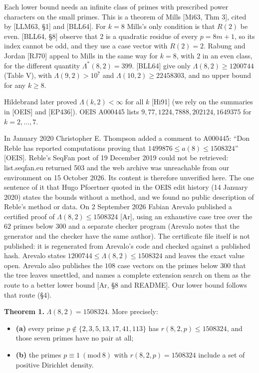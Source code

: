 \documentclass[
]{amsart}
\providecommand{\tightlist}{%
  \setlength{\itemsep}{0pt}\setlength{\parskip}{0pt}}
\begin{document}
Each lower bound needs an infinite class of primes with prescribed power
characters on the small primes. This is a theorem of Mills {[}Mi63, Thm
3{]}, cited by {[}LLM63, §1{]} and {[}BLL64{]}. For \(k=8\) Mills's only
condition is that \(R(2)\) be even. {[}BLL64, §8{]} observe that \(2\)
is a quadratic residue of every \(p=8m+1\), so its index cannot be odd,
and they use a case vector with \(R(2)=2\). Rabung and Jordan {[}RJ70{]}
appeal to Mills in the same way for \(k=8\), with \(2\) in an even
class, for the different quantity \(\Lambda^*(8,2)=399\). {[}BLL64{]}
give only \(\Lambda(8,2)\ge1200744\) (Table V), with
\(\Lambda(9,2)>10^7\) and \(\Lambda(10,2)\ge22458303\), and no upper
bound for any \(k\ge8\).

Hildebrand later proved \(\Lambda(k,2)<\infty\) for all \(k\) {[}Hi91{]}
(we rely on the summaries in {[}OEIS{]} and {[}EP436{]}). OEIS A000445
lists \(9,77,1224,7888,202124,1649375\) for \(k=2,\dots,7\).

In January 2020 Christopher E. Thompson added a comment to A000445:
``Don Reble has reported computations proving that
\(1499876\le a(8)\le1508324\)'' {[}OEIS{]}. Reble's SeqFan post of 19
December 2019 could not be retrieved: list.seqfan.eu returned 503 and
the web archive was unreachable from our environment on 15 October 2026.
Its content is therefore unverified here. The one sentence of it that
Hugo Pfoertner quoted in the OEIS edit history (14 January 2020) states
the bounds without a method, and we found no public description of
Reble's method or data. On 2 September 2026 Fabian Arevalo published a
certified proof of \(\Lambda(8,2)\le1508324\) {[}Ar{]}, using an
exhaustive case tree over the \(62\) primes below \(300\) and a separate
checker program (Arevalo notes that the generator and the checker have
the same author). The certificate file itself is not published: it is
regenerated from Arevalo's code and checked against a published hash.
Arevalo states \(1200744\le\Lambda(8,2)\le1508324\) and leaves the exact
value open. Arevalo also publishes the \(108\) case vectors on the
primes below \(300\) that the tree leaves unsettled, and names a
complete extension search on them as the route to a better lower bound
{[}Ar, §8 and README{]}. Our lower bound follows that route (§4).

\textbf{Theorem 1.} \(\Lambda(8,2)=1508324\). More precisely:

\begin{itemize}
\tightlist
\item
  \textbf{(a)} every prime \(p\notin\{2,3,5,13,17,41,113\}\) has
  \(r(8,2,p)\le1508324\), and those seven primes have no pair at all;
\item
  \textbf{(b)} the primes \(p\equiv1\ (\mathrm{mod}\ 8)\) with
  \(r(8,2,p)=1508324\) include a set of positive Dirichlet density.
\end{itemize}
\end{document}
